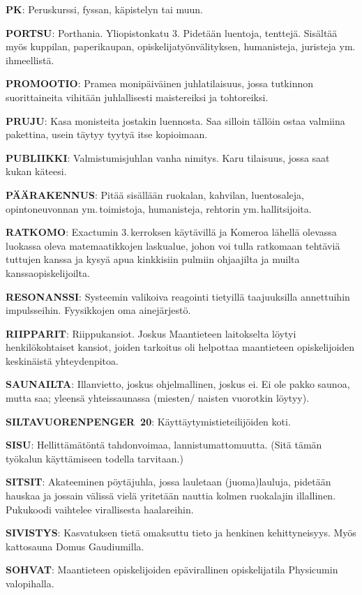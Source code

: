 \documentclass[../ala_hataile.tex]{subfiles}
\begin{document}
\textbf{PK}: Peruskurssi, fyssan, käpistelyn tai muun.

\textbf{PORTSU}: Porthania. Yliopistonkatu 3.
Pidetään luentoja, tenttejä. Sisältää myös
kuppilan, paperikaupan, opiskelijatyönvälityksen,
humanisteja, juristeja ym.\,ihmeellistä.

\textbf{PROMOOTIO}: Pramea monipäiväinen
juhlatilaisuus, jossa tutkinnon suorittaineita
vihitään juhlallisesti maistereiksi ja tohtoreiksi.

\textbf{PRUJU}: Kasa monisteita jostakin luennosta.
Saa silloin tällöin ostaa valmiina pakettina,
usein täytyy tyytyä itse kopioimaan.

\textbf{PUBLIIKKI}: Valmistumisjuhlan vanha nimitys. Karu tilaisuus, jossa saat kukan
käteesi.

\textbf{PÄÄRAKENNUS}: Pitää sisällään ruokalan,
kahvilan, luentosaleja, opintoneuvonnan
ym.\,toimistoja, humanisteja, rehtorin
ym.\,hallitsijoita.

\textbf{RATKOMO}: Exactumin 3.\,kerroksen
käytävillä ja Komeroa lähellä olevassa luokassa
oleva matemaatikkojen laskualue,
johon voi tulla ratkomaan tehtäviä tuttujen
kanssa ja kysyä apua kinkkisiin pulmiin
ohjaajilta ja muilta kanssaopiskelijoilta.

\textbf{RESONANSSI}: Systeemin valikoiva reagointi
tietyillä taajuuksilla annettuihin impulsseihin.
Fyysikkojen oma ainejärjestö.

\textbf{RIIPPARIT}: Riippukansiot. Joskus Maantieteen laitokselta löytyi henkilökohtaiset kansiot, joiden tarkoitus
oli helpottaa maantieteen opiskelijoiden
keskinäistä yhteydenpitoa.

\textbf{SAUNAILTA}: Illanvietto, joskus ohjelmallinen,
joskus ei. Ei ole pakko saunoa,
mutta saa; yleensä yhteissaunassa (miesten/
naisten vuorotkin löytyy).

\textbf{SILTAVUORENPENGER~20}: Käyt\-täy\-tymis\-tie\-tei\-li\-jöi\-den
koti.

\textbf{SISU}: Hellittämätöntä tahdonvoimaa, lannistumattomuutta. (Sitä tämän työkalun käyttämiseen todella tarvitaan.)

\textbf{SITSIT}: Akateeminen pöytäjuhla, jossa
lauletaan (juoma)lauluja, pidetään hauskaa
ja jossain välissä vielä yritetään nauttia kolmen
ruokalajin illallinen. Pukukoodi vaihtelee
virallisesta haalareihin.

\textbf{SIVISTYS}: Kasvatuksen tietä omaksuttu
tieto ja henkinen kehittyneisyys. Myös kattosauna
Domus Gaudiumilla.

\textbf{SOHVAT}: Maantieteen opiskelijoiden
epävirallinen opiskelijatila Physicumin valopihalla.
\end{document}
